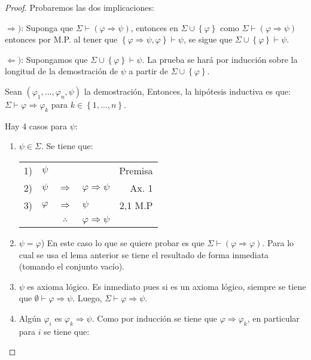 \documentclass[12pt]{report}
\theoremstyle{largebreak}
\begin{document}
    \begin{proof}
        Probaremos las dos implicaciones:

        $\Rightarrow)$: Suponga que $\Sigma\vdash(\varphi\Rightarrow\psi)$, entonces en $\Sigma\cup\left\{\varphi\right\}$ como $\Sigma\vdash(\varphi\Rightarrow\psi)$ entonces por M.P. al tener que $\left\{\varphi\Rightarrow\psi,\varphi \right\}\vdash\psi$, se sigue que $\Sigma\cup\left\{\varphi\right\}\vdash\psi$.

        $\Leftarrow)$: Supongamos que $\Sigma\cup\left\{\varphi\right\}\vdash\psi$. La prueba se hará por inducción sobre la longitud de la demostración de $\psi$ a partir de $\Sigma\cup\left\{\varphi \right\}$.

        Sean $(\varphi_1,...,\varphi_n,\psi)$ la demostración, Entonces, la hipótesis inductiva es que: $\Sigma\vdash \varphi\Rightarrow\varphi_k$ para $k\in\left\{1,...,n\right\}$.

        Hay 4 casos para $\psi$:
        \begin{enumerate}
            \item $\psi\in\Sigma$. Se tiene que:
            \begin{center}
                \begin{tabular}{l l c l r}
                    1) & $\psi$ &  &  & Premisa \\
                    2) & $\psi$ & $\Rightarrow$ & $\varphi\Rightarrow\psi$ & Ax. 1 \\
                    3) & $\varphi$ & $\Rightarrow$ & $\psi$ & 2,1 M.P \\
                    \hline
                    & & $\therefore$ & $\varphi\Rightarrow\psi$ & \\
                \end{tabular}
            \end{center}

            \item $\psi=\varphi$) En este caso lo que se quiere probar es que $\Sigma\vdash(\varphi\Rightarrow\varphi)$. Para lo cual se usa el lema anterior se tiene el resultado de forma inmediata (tomando el conjunto vacío).
            
            \item $\psi$ es axioma lógico. Es inmediato pues si es un axioma lógico, siempre se tiene que $ \emptyset\vdash \varphi\Rightarrow\psi$. Luego, $\Sigma\vdash\varphi\Rightarrow\psi$.
            
            \item Algún $\varphi_i$ es $\varphi_k\Rightarrow\psi$. Como por inducción se tiene que $\varphi\Rightarrow\varphi_k$, en particular para $i$ se tiene que:
            

\end{enumerate}
\end{proof}
\end{document}

